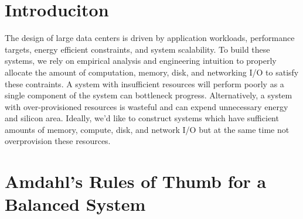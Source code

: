 \documentclass[a0,portrait]{a0poster}
\begin{document}
\vspace{1cm} %


\begin{multicols}{2} %


\color{Navy} %

\section{Introduciton}

The design of large data centers is driven by application workloads, performance targets, energy efficient constraints, and system scalability.
To build these systems, we rely on empirical analysis and engineering intuition to properly allocate the amount of computation, memory, disk, and networking I/O to satisfy these contraints.
A system with insufficient resources will perform poorly as a single component of the system can bottleneck progress.
Alternatively, a system with over-provisioned resources is wasteful and can expend unnecessary energy and silicon area.
Ideally, we'd like to construct systems which have sufficient amounts of memory, compute, disk, and network I/O but at the same time not overprovision these resources.


\color{SaddleBrown} %

\section*{Amdahl's Rules of Thumb for a Balanced System}


\end{multicols}
\end{document}
